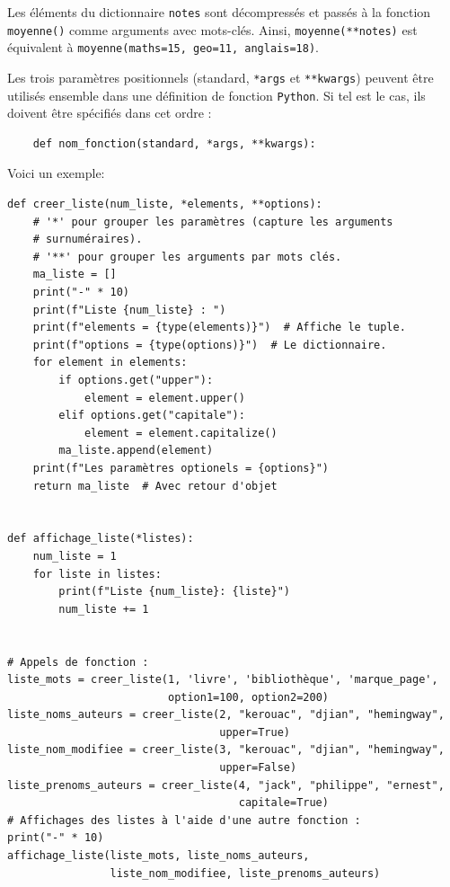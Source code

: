 \documentclass[a4paper,12pt]{book}
\begin{document}
Les éléments du dictionnaire \texttt{notes} sont décompressés et passés à la fonction \texttt{moyenne()} comme arguments avec mots-clés. Ainsi, \texttt{moyenne(**notes)} est équivalent à \texttt{moyenne(maths=15, geo=11, anglais=18)}.
\medskip

Les trois paramètres positionnels (standard, \texttt{*args} et \texttt{**kwargs}) peuvent être utilisés ensemble dans une définition de fonction \texttt{Python}. Si tel est le cas, ils doivent être spécifiés dans cet ordre :
\begin{verbatim}
    def nom_fonction(standard, *args, **kwargs):
\end{verbatim}
\medskip

Voici un exemple:
\begin{lstlisting}[caption=Paramètres mixées]
def creer_liste(num_liste, *elements, **options):
    # '*' pour grouper les paramètres (capture les arguments 
    # surnuméraires).
    # '**' pour grouper les arguments par mots clés.
    ma_liste = []
    print("-" * 10)
    print(f"Liste {num_liste} : ")
    print(f"elements = {type(elements)}")  # Affiche le tuple.
    print(f"options = {type(options)}")  # Le dictionnaire.
    for element in elements:
        if options.get("upper"):
            element = element.upper()
        elif options.get("capitale"):
            element = element.capitalize()
        ma_liste.append(element)
    print(f"Les paramètres optionels = {options}")
    return ma_liste  # Avec retour d'objet


def affichage_liste(*listes):
    num_liste = 1
    for liste in listes:
        print(f"Liste {num_liste}: {liste}")
        num_liste += 1


# Appels de fonction :
liste_mots = creer_liste(1, 'livre', 'bibliothèque', 'marque_page',
                         option1=100, option2=200)
liste_noms_auteurs = creer_liste(2, "kerouac", "djian", "hemingway",
                                 upper=True)
liste_nom_modifiee = creer_liste(3, "kerouac", "djian", "hemingway",
                                 upper=False)
liste_prenoms_auteurs = creer_liste(4, "jack", "philippe", "ernest",
                                    capitale=True)
# Affichages des listes à l'aide d'une autre fonction :
print("-" * 10)
affichage_liste(liste_mots, liste_noms_auteurs,
                liste_nom_modifiee, liste_prenoms_auteurs)
\end{lstlisting}
\medskip
\end{document}
